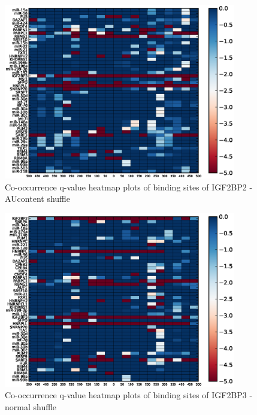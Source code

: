\begin{figure}
   	\includegraphics[width=0.9\textwidth]{appendix1/figures/IGF2BP2_AUcontent_expressed_heatmap_qvalues0.eps}
   	\caption{Co-occurrence q-value heatmap plots of binding sites of IGF2BP2 - AUcontent shuffle}
\end{figure}
\clearpage
\begin{figure}
   	\includegraphics[width=0.9\textwidth]{appendix1/figures/IGF2BP3_normal_expressed_heatmap_qvalues0.eps}
   	\caption{Co-occurrence q-value heatmap plots of binding sites of IGF2BP3 - normal shuffle}
\end{figure}

